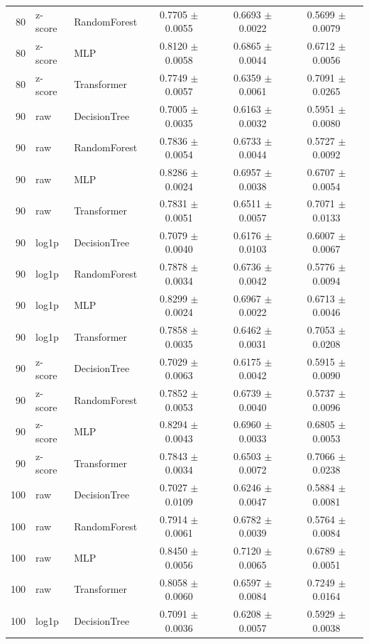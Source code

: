\begin{longtable}{rllccc}
80 & z-score & RandomForest & 0.7705 $\pm$ 0.0055 & 0.6693 $\pm$ 0.0022 & 0.5699 $\pm$ 0.0079 \\
80 & z-score & MLP & 0.8120 $\pm$ 0.0058 & 0.6865 $\pm$ 0.0044 & 0.6712 $\pm$ 0.0056 \\
80 & z-score & Transformer & 0.7749 $\pm$ 0.0057 & 0.6359 $\pm$ 0.0061 & 0.7091 $\pm$ 0.0265 \\
90 & raw & DecisionTree & 0.7005 $\pm$ 0.0035 & 0.6163 $\pm$ 0.0032 & 0.5951 $\pm$ 0.0080 \\
90 & raw & RandomForest & 0.7836 $\pm$ 0.0054 & 0.6733 $\pm$ 0.0044 & 0.5727 $\pm$ 0.0092 \\
90 & raw & MLP & 0.8286 $\pm$ 0.0024 & 0.6957 $\pm$ 0.0038 & 0.6707 $\pm$ 0.0054 \\
90 & raw & Transformer & 0.7831 $\pm$ 0.0051 & 0.6511 $\pm$ 0.0057 & 0.7071 $\pm$ 0.0133 \\
90 & log1p & DecisionTree & 0.7079 $\pm$ 0.0040 & 0.6176 $\pm$ 0.0103 & 0.6007 $\pm$ 0.0067 \\
90 & log1p & RandomForest & 0.7878 $\pm$ 0.0034 & 0.6736 $\pm$ 0.0042 & 0.5776 $\pm$ 0.0094 \\
90 & log1p & MLP & 0.8299 $\pm$ 0.0024 & 0.6967 $\pm$ 0.0022 & 0.6713 $\pm$ 0.0046 \\
90 & log1p & Transformer & 0.7858 $\pm$ 0.0035 & 0.6462 $\pm$ 0.0031 & 0.7053 $\pm$ 0.0208 \\
90 & z-score & DecisionTree & 0.7029 $\pm$ 0.0063 & 0.6175 $\pm$ 0.0042 & 0.5915 $\pm$ 0.0090 \\
90 & z-score & RandomForest & 0.7852 $\pm$ 0.0053 & 0.6739 $\pm$ 0.0040 & 0.5737 $\pm$ 0.0096 \\
90 & z-score & MLP & 0.8294 $\pm$ 0.0043 & 0.6960 $\pm$ 0.0033 & 0.6805 $\pm$ 0.0053 \\
90 & z-score & Transformer & 0.7843 $\pm$ 0.0034 & 0.6503 $\pm$ 0.0072 & 0.7066 $\pm$ 0.0238 \\
100 & raw & DecisionTree & 0.7027 $\pm$ 0.0109 & 0.6246 $\pm$ 0.0047 & 0.5884 $\pm$ 0.0081 \\
100 & raw & RandomForest & 0.7914 $\pm$ 0.0061 & 0.6782 $\pm$ 0.0039 & 0.5764 $\pm$ 0.0084 \\
100 & raw & MLP & 0.8450 $\pm$ 0.0056 & 0.7120 $\pm$ 0.0065 & 0.6789 $\pm$ 0.0051 \\
100 & raw & Transformer & 0.8058 $\pm$ 0.0060 & 0.6597 $\pm$ 0.0084 & 0.7249 $\pm$ 0.0164 \\
100 & log1p & DecisionTree & 0.7091 $\pm$ 0.0036 & 0.6208 $\pm$ 0.0057 & 0.5929 $\pm$ 0.0038 \\

\end{longtable}
